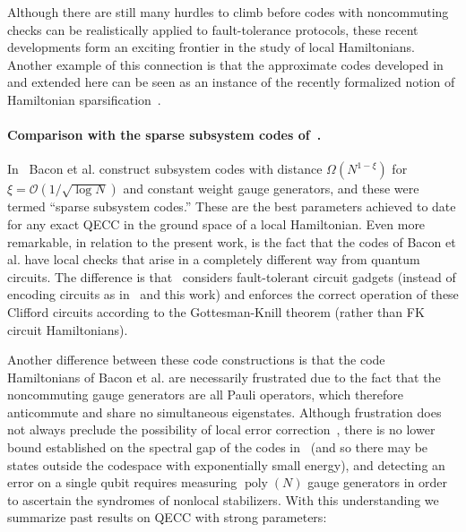 \documentclass[11pt,letterpaper]{article}
\theoremstyle{definition}
\theoremstyle{remark}
\DeclareMathOperator{\poly}{poly}
\numberwithin{equation}{section}
\let\origparagraph\paragraph
\renewcommand{\paragraph}[1]{\origparagraph{#1.}}
\theoremstyle{definition}
\begin{document}
Although there are still many hurdles to climb before codes with noncommuting checks can be realistically applied to fault-tolerance protocols, these recent developments form an exciting frontier 
in the study of local Hamiltonians.  Another example of this connection is that the approximate codes developed in~\cite{nirkhe_et_al:LIPIcs:2018:9095} and extended here can be seen as an instance of the recently formalized notion of Hamiltonian sparsification~\cite{aharonov2018gap}.  


%

%

%

\paragraph{Comparison with the sparse subsystem codes of~\cite{bacon2017sparse}}

In~\cite{bacon2017sparse} Bacon et al. construct subsystem codes with distance $\Omega(N^{1-\xi})$ for $\xi = \mathcal{O}(1/\sqrt{\log N})$ and constant weight gauge generators, and these were termed ``sparse subsystem codes.''  These are the best parameters achieved to date for any exact QECC in the ground space of a local Hamiltonian.  Even more remarkable, in relation to the present work, is the fact that the codes of Bacon et al. have local checks that arise in a completely different way from quantum circuits.  The difference is that~\cite{bacon2017sparse} considers fault-tolerant circuit gadgets (instead of encoding circuits as in~\cite{nirkhe_et_al:LIPIcs:2018:9095} and this work) and enforces the correct operation of these Clifford circuits according to the Gottesman-Knill theorem (rather than FK circuit Hamiltonians).  

Another difference between these code constructions is that the code Hamiltonians of Bacon et al. are necessarily frustrated due to the fact that the noncommuting gauge generators are all Pauli operators, which therefore anticommute and share no simultaneous eigenstates.  Although frustration does not always preclude the possibility of local error correction~\cite{flammia2017limits}, there is no lower bound established on the spectral gap of the codes in~\cite{bacon2017sparse} (and so there may be states outside the codespace with exponentially small energy), and detecting an error on a single qubit requires measuring $\poly(N)$ gauge generators in order to ascertain the syndromes of nonlocal stabilizers.   With this understanding we summarize past results on QECC with strong parameters: %
\end{document}
